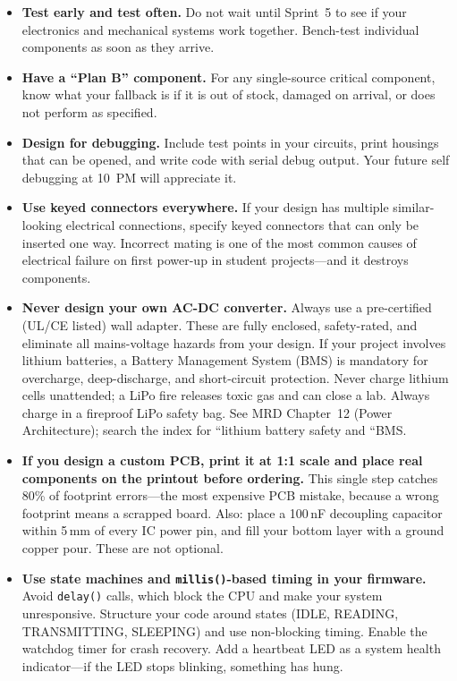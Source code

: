 \documentclass[11pt,letterpaper]{article}
\begin{document}
\begin{itemize}[leftmargin=*, itemsep=4pt]
    \item \textbf{Test early and test often.} Do not wait until Sprint~5 to see if your electronics and mechanical systems work together. Bench-test individual components as soon as they arrive.
    \item \textbf{Have a ``Plan B'' component.} For any single-source critical component, know what your fallback is if it is out of stock, damaged on arrival, or does not perform as specified.
    \item \textbf{Design for debugging.} Include test points in your circuits, print housings that can be opened, and write code with serial debug output. Your future self debugging at 10~PM will appreciate it.
    \item \textbf{Use keyed connectors everywhere.} If your design has multiple similar-looking electrical connections, specify keyed connectors that can only be inserted one way. Incorrect mating is one of the most common causes of electrical failure on first power-up in student projects---and it destroys components.
    \item \textbf{Never design your own AC-DC converter.} Always use a pre-certified (UL/CE listed) wall adapter. These are fully enclosed, safety-rated, and eliminate all mains-voltage hazards from your design. If your project involves lithium batteries, a Battery Management System (BMS) is mandatory for overcharge, deep-discharge, and short-circuit protection. Never charge lithium cells unattended; a LiPo fire releases toxic gas and can close a lab. Always charge in a fireproof LiPo safety bag. See MRD Chapter~12 (Power Architecture); search the index for ``lithium battery safety and ``BMS.
    \item \textbf{If you design a custom PCB, print it at 1:1 scale and place real components on the printout before ordering.} This single step catches 80\% of footprint errors---the most expensive PCB mistake, because a wrong footprint means a scrapped board. Also: place a 100\,nF decoupling capacitor within 5\,mm of every IC power pin, and fill your bottom layer with a ground copper pour. These are not optional.
    \item \textbf{Use state machines and \texttt{millis()}-based timing in your firmware.} Avoid \texttt{delay()} calls, which block the CPU and make your system unresponsive. Structure your code around states (IDLE, READING, TRANSMITTING, SLEEPING) and use non-blocking timing. Enable the watchdog timer for crash recovery. Add a heartbeat LED as a system health indicator---if the LED stops blinking, something has hung.
\end{itemize}
\end{document}
